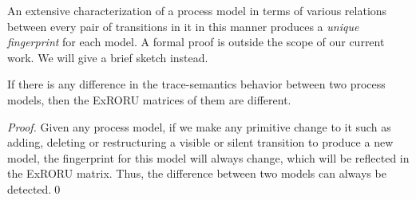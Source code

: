 \documentclass{llncs}
\begin{document}
\begin{table}[htbp]
{\begin{tabular}{|c|c|c|c|c|c|c|c|}
	\end{tabular}
}
\hspace{0.5em}
\end{table}

An extensive characterization of a process model in terms of various relations between every pair of transitions in it in this manner produces a \textit{unique fingerprint} for each model. A formal proof is outside the scope of our current work. We will give a brief sketch instead. %

\begin{theorem}[Uniqueness]\label{the:uniqueness}
If there is any difference in the trace-semantics behavior between two process models, then the ExRORU matrices of them are different.
\end{theorem}
\begin{proof}
Given any process model, if we make any primitive change to it such as adding, deleting or restructuring a visible or silent transition to produce a new model, the fingerprint for this model will always change, which will be reflected in the ExRORU matrix. Thus, the difference between two models can always be detected.\qed
\end{proof}
\end{document}
